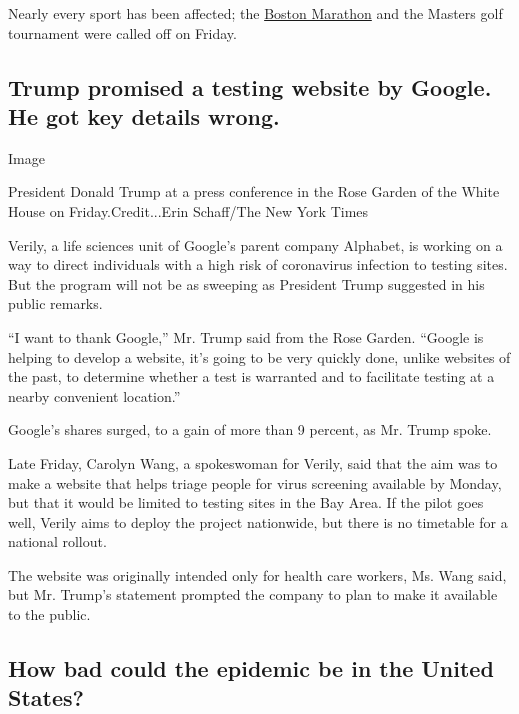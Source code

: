 Nearly every sport has been affected; the
\href{https://www.nytimes3xbfgragh.onion/2020/03/13/sports/the-boston-marathon-has-been-postponed-until-sept-14.html}{Boston
Marathon} and the Masters golf tournament were called off on Friday.

\hypertarget{trump-promised-a-testing-website-by-google-he-got-key-details-wrong}{%
\subsection{Trump promised a testing website by Google. He got key
details
wrong.}\label{trump-promised-a-testing-website-by-google-he-got-key-details-wrong}}

Image

President Donald Trump at a press conference in the Rose Garden of the
White House on Friday.Credit...Erin Schaff/The New York Times

Verily, a life sciences unit of Google's parent company Alphabet, is
working on a way to direct individuals with a high risk of coronavirus
infection to testing sites. But the program will not be as sweeping as
President Trump suggested in his public remarks.

``I want to thank Google,'' Mr. Trump said from the Rose Garden.
``Google is helping to develop a website, it's going to be very quickly
done, unlike websites of the past, to determine whether a test is
warranted and to facilitate testing at a nearby convenient location.''

Google's shares surged, to a gain of more than 9 percent, as Mr. Trump
spoke.

Late Friday, Carolyn Wang, a spokeswoman for Verily, said that the aim
was to make a website that helps triage people for virus screening
available by Monday, but that it would be limited to testing sites in
the Bay Area. If the pilot goes well, Verily aims to deploy the project
nationwide, but there is no timetable for a national rollout.

The website was originally intended only for health care workers, Ms.
Wang said, but Mr. Trump's statement prompted the company to plan to
make it available to the public.

\hypertarget{how-bad-could-the-epidemic-be-in-the-united-states}{%
\subsection{How bad could the epidemic be in the United
States?}\label{how-bad-could-the-epidemic-be-in-the-united-states}}

